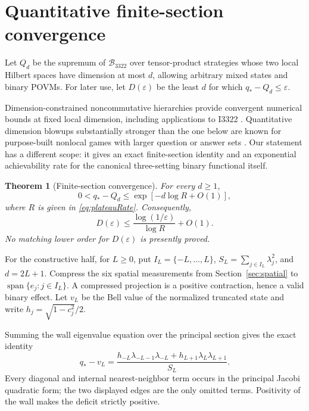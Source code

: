 \documentclass[11pt]{article}
\newtheorem{theorem}{Theorem}
\newcommand{\B}{\mathcal B_{3322}}
\begin{document}
\section{Quantitative finite-section convergence}
\label{sec:dimension-rate}

Let $Q_d$ be the supremum of $\B$ over tensor-product strategies whose two
local Hilbert spaces have dimension at most $d$, allowing arbitrary mixed
states and binary POVMs.  For
later use, let $D(\varepsilon)$ be the least $d$ for which
$q_*-Q_d\leq\varepsilon$.

Dimension-constrained noncommutative hierarchies provide convergent numerical
bounds at fixed local dimension, including applications to I3322
\cite{NavascuesEtAl2015}.  Quantitative dimension blowups substantially
stronger than the one below are known for purpose-built nonlocal games with
larger question or answer sets \cite{Coladangelo2020}.  Our statement has a
different scope: it gives an exact finite-section identity and an exponential
achievability rate for the canonical three-setting binary functional itself.

\begin{theorem}[Finite-section convergence]\label{thm:dimension-law}
For every $d\geq1$,
\begin{equation}
 0<q_*-Q_d\leq \exp[-d\log R+O(1)],
\label{eq:dimensionLaw}
\end{equation}
where $R$ is given in \eqref{eq:plateauRate}. Consequently,
\begin{equation}
 D(\varepsilon)\leq \frac{\log(1/\varepsilon)}{\log R}+O(1).
\label{eq:dimensionTheta}
\end{equation}
No matching lower order for $D(\varepsilon)$ is presently proved.
\end{theorem}

For the constructive half, for
$L\geq0$, put $I_L=\{-L,\ldots,L\}$,
$S_L=\sum_{j\in I_L}\lambda_j^2$, and $d=2L+1$.  Compress the six spatial
measurements from Section~\ref{sec:spatial} to
$\operatorname{span}\{e_j:j\in I_L\}$.  A compressed projection is a positive
contraction, hence a valid binary effect.  Let $v_L$ be the Bell value of the
normalized truncated state and write $h_j=\sqrt{1-c_j^2}/2$.

Summing the wall eigenvalue equation over the principal section gives the
exact identity
\begin{equation}
q_*-v_L=
\frac{h_{-L}\lambda_{-L-1}\lambda_{-L}
      +h_{L+1}\lambda_L\lambda_{L+1}}{S_L}.
\label{eq:boundaryFlux}
\end{equation}
Every diagonal and internal nearest-neighbor term occurs in the principal
Jacobi quadratic form; the two displayed edges are the only omitted terms.
Positivity of the wall makes the deficit strictly positive.
\end{document}
